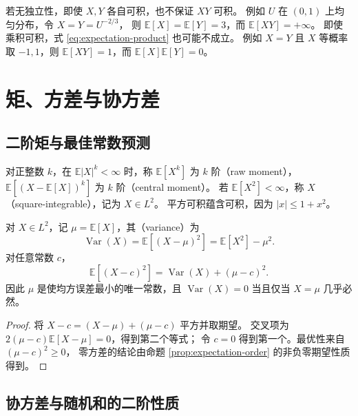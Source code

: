 \documentclass[UTF8]{ctexart}
\begin{document}
若无独立性，即使 $X,Y$ 各自可积，也不保证 $XY$ 可积。
例如 $U$ 在 $(0,1)$ 上均匀分布，令 $X=Y=U^{-2/3}$，
则 $\mathbb E[X]=\mathbb E[Y]=3$，而 $\mathbb E[XY]=+\infty$。
即使乘积可积，式 \eqref{eq:expectation-product} 也可能不成立。
例如 $X=Y$ 且 $X$ 等概率取 $-1,1$，则 $\mathbb E[XY]=1$，而
$\mathbb E[X]\mathbb E[Y]=0$。

\section{矩、方差与协方差}
\label{sec:expectation-moments}

\subsection{二阶矩与最佳常数预测}

对正整数 $k$，在 $\mathbb E|X|^k<\infty$ 时，称 $\mathbb E[X^k]$ 为
$k$ 阶（raw moment），
$\mathbb E[(X-\mathbb E[X])^k]$ 为 $k$ 阶（central moment）。
若 $\mathbb E[X^2]<\infty$，称 $X$ （square-integrable），记为 $X\in L^2$。
平方可积蕴含可积，因为 $|x|\leq1+x^2$。

\begin{proposition}[方差分解]
\label{prop:expectation-variance}
对 $X\in L^2$，记 $\mu=\mathbb E[X]$，其（variance）为
\begin{equation}
  \operatorname{Var}(X)
  =\mathbb E[(X-\mu)^2]
  =\mathbb E[X^2]-\mu^2.
  \label{eq:expectation-variance}
\end{equation}
对任意常数 $c$，
\begin{equation}
  \mathbb E[(X-c)^2]
  =\operatorname{Var}(X)+(\mu-c)^2.
  \label{eq:expectation-best-constant}
\end{equation}
因此 $\mu$ 是使均方误差最小的唯一常数，且
$\operatorname{Var}(X)=0$ 当且仅当 $X=\mu$ 几乎必然。
\end{proposition}

\begin{proof}
将 $X-c=(X-\mu)+(\mu-c)$ 平方并取期望。
交叉项为 $2(\mu-c)\mathbb E[X-\mu]=0$，得到第二个等式；
令 $c=0$ 得到第一个。最优性来自 $(\mu-c)^2\geq0$，
零方差的结论由命题 \ref{prop:expectation-order} 的非负零期望性质得到。
\end{proof}

\subsection{协方差与随机和的二阶性质}
\end{document}
